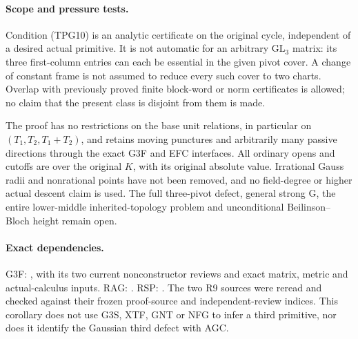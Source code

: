 \paragraph{Scope and pressure tests.}
Condition (TPG10) is an analytic certificate on the original
cycle, independent of a desired actual primitive.  It is not
automatic for an arbitrary $\mathrm{GL}_3$ matrix: its three
first-column entries can each be essential in the given pivot
cover.  A change of constant frame is not assumed to reduce
every such cover to two charts.  Overlap with previously proved
finite block-word or norm certificates is allowed; no claim
that the present class is disjoint from them is made.

The proof has no restrictions on the base unit relations, in
particular on $(T_1,T_2,T_1+T_2)$, and retains moving punctures
and arbitrarily many passive directions through the exact G3F
and EFC interfaces.  All ordinary opens and cutoffs are over
the original $K$, with its original absolute value.  Irrational
Gauss radii and nonrational points have not been removed, and
no field-degree or higher actual descent claim is used.
The full three-pivot defect, general strong G, the entire
lower-middle inherited-topology problem and unconditional
Beilinson--Bloch height remain open.

\paragraph{Exact dependencies.}
G3F: ,
with its two current nonconstructor reviews and exact matrix,
metric and actual-calculus inputs.
RAG: .
RSP: .
The two R9 sources were reread and checked against their frozen
proof-source and independent-review indices.  This corollary
does not use G3S, XTF, GNT or NFG to infer a third primitive,
nor does it identify the Gaussian third defect with AGC.

